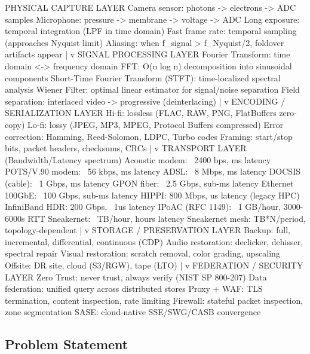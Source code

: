 \documentclass[11pt,letterpaper]{article}
\newenvironment{asciibox}{%
  \begin{tcolorbox}[colback=MidGray!8,colframe=MidGray!40,arc=2pt,left=6pt,right=6pt,top=4pt,bottom=4pt,breakable]
  \ttfamily\small
}{%
  \end{tcolorbox}
}
\begin{document}
\begin{asciibox}
PHYSICAL CAPTURE LAYER
  Camera sensor: photons -> electrons -> ADC samples
  Microphone: pressure -> membrane -> voltage -> ADC
  Long exposure: temporal integration (LPF in time domain)
  Fast frame rate: temporal sampling (approaches Nyquist limit)
  Aliasing: when f_signal > f_Nyquist/2, foldover artifacts appear
  |
  v
SIGNAL PROCESSING LAYER
  Fourier Transform: time domain <-> frequency domain
  FFT: O(n log n) decomposition into sinusoidal components
  Short-Time Fourier Transform (STFT): time-localized spectral analysis
  Wiener Filter: optimal linear estimator for signal/noise separation
  Field separation: interlaced video -> progressive (deinterlacing)
  |
  v
ENCODING / SERIALIZATION LAYER
  Hi-fi: lossless (FLAC, RAW, PNG, FlatBuffers zero-copy)
  Lo-fi: lossy (JPEG, MP3, MPEG, Protocol Buffers compressed)
  Error correction: Hamming, Reed-Solomon, LDPC, Turbo codes
  Framing: start/stop bits, packet headers, checksums, CRCs
  |
  v
TRANSPORT LAYER (Bandwidth/Latency spectrum)
  Acoustic modem:      ~2400 bps,   ms latency
  POTS/V.90 modem:    ~56 kbps,    ms latency
  ADSL:               ~8 Mbps,     ms latency
  DOCSIS (cable):     ~1 Gbps,     ms latency
  GPON fiber:         ~2.5 Gbps,   sub-ms latency
  Ethernet 100GbE:    ~100 Gbps,   sub-ms latency
  HIPPI:              800 Mbps,    us latency (legacy HPC)
  InfiniBand HDR:     200 Gbps,    ~1us latency
  IPoAC (RFC 1149):   ~1 GB/hour,  3000-6000s RTT
  Sneakernet:         ~TB/hour,    hours latency
  Sneakernet mesh:    TB*N/period, topology-dependent
  |
  v
STORAGE / PRESERVATION LAYER
  Backup: full, incremental, differential, continuous (CDP)
  Audio restoration: declicker, dehisser, spectral repair
  Visual restoration: scratch removal, color grading, upscaling
  Offsite: DR site, cloud (S3/RGW), tape (LTO)
  |
  v
FEDERATION / SECURITY LAYER
  Zero Trust: never trust, always verify (NIST SP 800-207)
  Data federation: unified query across distributed stores
  Proxy + WAF: TLS termination, content inspection, rate limiting
  Firewall: stateful packet inspection, zone segmentation
  SASE: cloud-native SSE/SWG/CASB convergence
\end{asciibox}

\subsection{Problem Statement}
\end{document}
